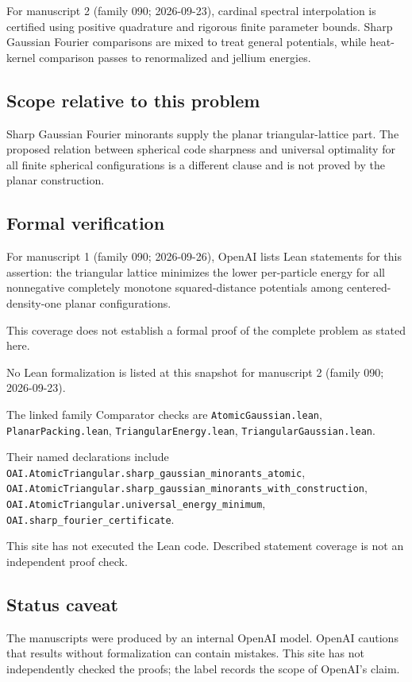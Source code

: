 \documentclass[11pt]{article}
\begin{document}
For manuscript 2 (family 090; 2026-09-23), cardinal spectral interpolation is certified using positive quadrature and rigorous finite parameter bounds. Sharp Gaussian Fourier comparisons are mixed to treat general potentials, while heat-kernel comparison passes to renormalized and jellium energies.

\subsection{Scope relative to this problem}
Sharp Gaussian Fourier minorants supply the planar triangular-lattice part. The proposed relation between spherical code sharpness and universal optimality for all finite spherical configurations is a different clause and is not proved by the planar construction.

\subsection{Formal verification}
For manuscript 1 (family 090; 2026-09-26), OpenAI lists Lean statements for this assertion: the triangular lattice minimizes the lower per-particle energy for all nonnegative completely monotone squared-distance potentials among centered-density-one planar configurations.

This coverage does not establish a formal proof of the complete problem as stated here.

No Lean formalization is listed at this snapshot for manuscript 2 (family 090; 2026-09-23).

The linked family Comparator checks are \texttt{AtomicGaussian.lean}, \texttt{PlanarPacking.lean}, \texttt{TriangularEnergy.lean}, \texttt{TriangularGaussian.lean}.

Their named declarations include \texttt{OAI.AtomicTriangular.sharp\_gaussian\_minorants\_atomic}, \texttt{OAI.AtomicTriangular.sharp\_gaussian\_minorants\_with\_construction}, \texttt{OAI.AtomicTriangular.universal\_energy\_minimum}, \texttt{OAI.sharp\_fourier\_certificate}.

This site has not executed the Lean code. Described statement coverage is not an independent proof check.

\subsection{Status caveat}
The manuscripts were produced by an internal OpenAI model. OpenAI cautions that results without formalization can contain mistakes. This site has not independently checked the proofs; the label records the scope of OpenAI's claim.
\end{document}

